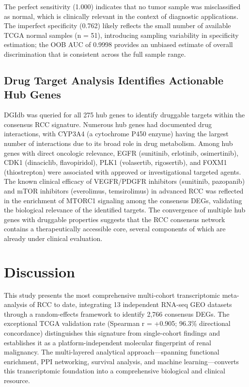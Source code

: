 \documentclass[
  12pt,
]{article}
\begin{document}
The perfect sensitivity (1.000) indicates that no tumor sample was
misclassified as normal, which is clinically relevant in the context of
diagnostic applications. The imperfect specificity (0.762) likely
reflects the small number of available TCGA normal samples (n = 51),
introducing sampling variability in specificity estimation; the OOB AUC
of 0.9998 provides an unbiased estimate of overall discrimination that
is consistent across the full sample range.

\subsection{Drug Target Analysis Identifies Actionable Hub
Genes}\label{drug-target-analysis-identifies-actionable-hub-genes}

DGIdb was queried for all 275 hub genes to identify druggable targets
within the consensus RCC signature. Numerous hub genes had documented
drug interactions, with CYP3A4 (a cytochrome P450 enzyme) having the
largest number of interactions due to its broad role in drug metabolism.
Among hub genes with direct oncologic relevance, EGFR (sunitinib,
erlotinib, osimertinib), CDK1 (dinaciclib, flavopiridol), PLK1
(volasertib, rigosertib), and FOXM1 (thiostrepton) were associated with
approved or investigational targeted agents. The known clinical efficacy
of VEGFR/PDGFR inhibitors (sunitinib, pazopanib) and mTOR inhibitors
(everolimus, temsirolimus) in advanced RCC was reflected in the
enrichment of MTORC1 signaling among the consensus DEGs, validating the
biological relevance of the identified targets. The convergence of
multiple hub genes with druggable properties suggests that the RCC
consensus network contains a therapeutically accessible core, several
components of which are already under clinical evaluation.

\section{Discussion}\label{discussion}

This study presents the most comprehensive multi-cohort transcriptomic
meta-analysis of RCC to date, integrating 13 independent RNA-seq GEO
datasets through a random-effects framework to identify 2,766 consensus
DEGs. The exceptional TCGA validation rate (Spearman r = +0.905; 96.3\%
directional concordance) distinguishes this signature from single-cohort
findings and establishes it as a platform-independent molecular
fingerprint of renal malignancy. The multi-layered analytical
approach---spanning functional enrichment, PPI networking, survival
analysis, and machine learning---converts this transcriptomic foundation
into a comprehensive biological and clinical resource.
\end{document}
